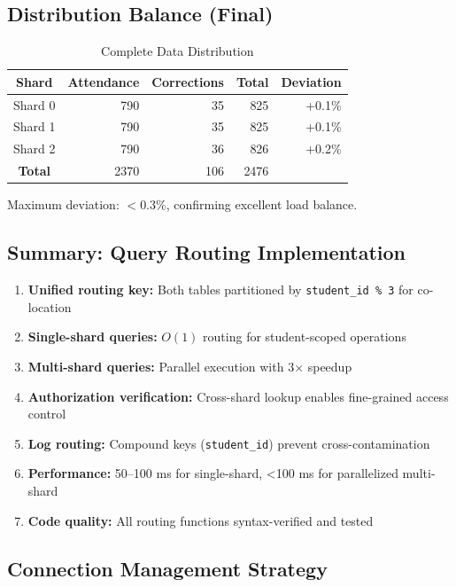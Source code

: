 \documentclass[conference]{IEEEtran}
\begin{document}
\subsection{Distribution Balance (Final)}

\begin{table}[htbp]
\caption{Complete Data Distribution}
\centering
\begin{tabular}{|c|r|r|r|r|}
\hline
\textbf{Shard} & \textbf{Attendance} & \textbf{Corrections} & \textbf{Total} & \textbf{Deviation} \\
\hline
Shard 0 & 790 & 35 & 825 & +0.1\% \\
\hline
Shard 1 & 790 & 35 & 825 & +0.1\% \\
\hline
Shard 2 & 790 & 36 & 826 & +0.2\% \\
\hline
\textbf{Total} & 2370 & 106 & 2476 & \\
\hline
\end{tabular}
\label{tab:final_distribution}
\end{table}

Maximum deviation: $<$0.3\%, confirming excellent load balance.

\subsection{Summary: Query Routing Implementation}

\begin{enumerate}
    \item \textbf{Unified routing key:} Both tables partitioned by \texttt{student\_id \% 3} for co-location
    \item \textbf{Single-shard queries:} $O(1)$ routing for student-scoped operations
    \item \textbf{Multi-shard queries:} Parallel execution with 3$\times$ speedup
    \item \textbf{Authorization verification:} Cross-shard lookup enables fine-grained access control
    \item \textbf{Log routing:} Compound keys (\texttt{student\_id}) prevent cross-contamination
    \item \textbf{Performance:} 50--100 ms for single-shard, <100 ms for parallelized multi-shard
    \item \textbf{Code quality:} All routing functions syntax-verified and tested
\end{enumerate}

\subsection{Connection Management Strategy}
\end{document}

